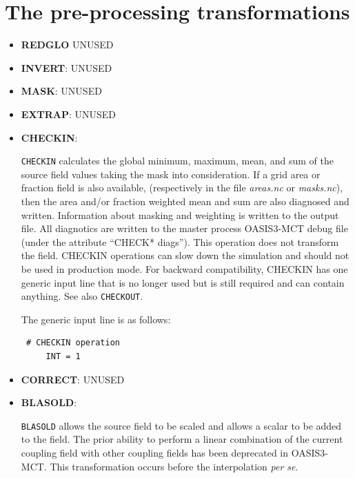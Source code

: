 \section{The pre-processing transformations}
\label{subsec_preproc}

\begin{itemize}

\item {\bf REDGLO} UNUSED

\item {\bf INVERT}: UNUSED

\item {\bf MASK}: UNUSED
 
\item {\bf EXTRAP}: UNUSED

\item {\bf CHECKIN}:

  {\tt CHECKIN} calculates the global minimum, maximum, mean, and 
  sum of the source field values taking the mask into consideration.  If a grid area
  or fraction field is also available, (respectively in the file {\it
    areas.nc} or {\it masks.nc}), then the area and/or fraction weighted
  mean and sum are also diagnosed and written.  Information about masking
  and weighting is written to the output file.  All diagnotics are
  written to the master
  process OASIS3-MCT debug file (under the attribute ``CHECK* diags'').
  This operation does not transform the field. CHECKIN operations can
  slow down the simulation and should not be used in
  production mode.  For backward compatibility, CHECKIN has one generic
  input line that is no longer used but is still required and can contain anything.
  See also {\tt CHECKOUT}.

  The generic input line is as follows:
 \begin{verbatim}
 # CHECKIN operation
     INT = 1  
\end{verbatim} 

\item {\bf CORRECT}: UNUSED

\item {\bf BLASOLD}:

  {\tt BLASOLD} allows the source field to be scaled and allows a
  scalar to be added to the field.  The prior ability to perform a
  linear combination of the current coupling field with other coupling
  fields has been deprecated in OASIS3-MCT.  This transformation
  occurs before the interpolation {\it per se}.


\end{itemize}
